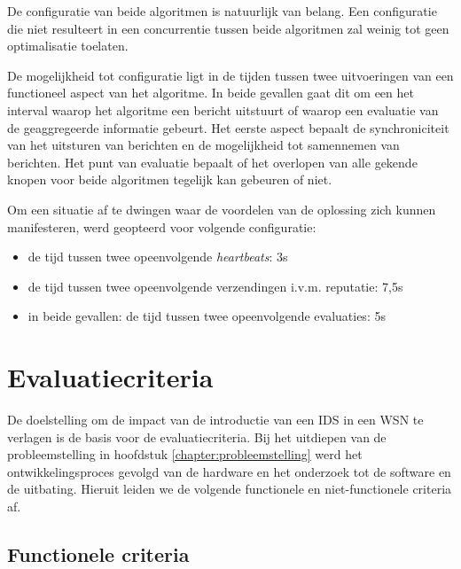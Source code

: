 De configuratie van beide algoritmen is natuurlijk van belang. Een configuratie
die niet resulteert in een concurrentie tussen beide algoritmen zal weinig tot
geen optimalisatie toelaten.

De mogelijkheid tot configuratie ligt in de tijden tussen twee uitvoeringen van
een functioneel aspect van het algoritme. In beide gevallen gaat dit om een het
interval waarop het algoritme een bericht uitstuurt of waarop een evaluatie van
de geaggregeerde informatie gebeurt. Het eerste aspect bepaalt de
synchroniciteit van het uitsturen van berichten en de mogelijkheid tot
samennemen van berichten. Het punt van evaluatie bepaalt of het overlopen van
alle gekende knopen voor beide algoritmen tegelijk kan gebeuren of niet.

Om een situatie af te dwingen waar de voordelen van de oplossing zich kunnen
manifesteren, werd geopteerd voor volgende configuratie:

\begin{itemize}[noitemsep, topsep=0pt, partopsep=0pt]

  \item de tijd tussen twee opeenvolgende \emph{heartbeats}: 3s

  \item de tijd tussen twee opeenvolgende verzendingen i.v.m. reputatie: 7,5s

  \item in beide gevallen: de tijd tussen twee opeenvolgende evaluaties: 5s

\end{itemize}

\vspace{-3mm}

\section{Evaluatiecriteria}
\label{section:criteria}

De doelstelling om de impact van de introductie van een IDS in een WSN te
verlagen is de basis voor de evaluatiecriteria. Bij het uitdiepen van de
probleemstelling in hoofdstuk \ref{chapter:probleemstelling} werd het
ontwikkelingsproces gevolgd van de hardware en het onderzoek tot de software en
de uitbating. Hieruit leiden we de volgende functionele en niet-functionele
criteria af.

\vspace{-3mm}

\subsection{Functionele criteria}


